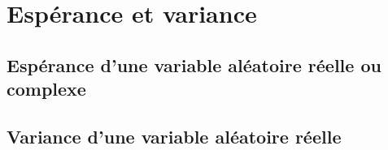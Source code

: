 \chapter{Espérance et variance} %
\label{chap:Espérance et variance}

\section{Espérance d'une variable aléatoire réelle ou complexe} %


\section{Variance d'une variable aléatoire réelle} %
\label{sec:Variance d'une variable aléatoire réelle}


